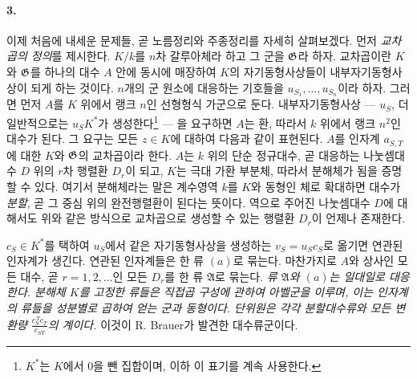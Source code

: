 \paragraph{3.}
이제 처음에 내세운 문제들, 곧 노름정리와 주종정리를 자세히 살펴보겠다. 먼저 \emph{교차곱의 정의}를 제시한다. \(K/k\)를 \(n\)차 갈루아체라 하고 그 군을 \(\mathfrak G\)라 하자. 교차곱이란 \(K\)와 \(\mathfrak G\)를 하나의 대수 \(A\) 안에 동시에 매장하여 \(K\)의 자기동형사상들이 내부자기동형사상이 되게 하는 것이다. \(n\)개의 군 원소에 대응하는 기호들을 \(u_{S_1},\ldots,u_{S_n}\)이라 하자. 그러면 먼저 \(A\)를 \(K\) 위에서 랭크 \(n\)인 선형형식 가군으로 둔다.
내부자기동형사상 --- \(u_S\), 더 일반적으로는 \(u_SK^\ast\)가 생성한다\footnote{\(K^\ast\)는 \(K\)에서 0을 뺀 집합이며, 이하 이 표기를 계속 사용한다.} --- 을 요구하면 \(A\)는 환, 따라서 \(k\) 위에서 랭크 \(n^2\)인 대수가 된다. 그 요구는 모든 \(z\in K\)에 대하여 다음과 같이 표현된다.
\(A\)를 인자계 \(a_{S,T}\)에 대한 \(K\)와 \(\mathfrak G\)의 교차곱이라 한다. \(A\)는 \(k\) 위의 단순 정규대수, 곧 대응하는 나눗셈대수 \(D\) 위의 \(r\)차 행렬환 \(D_r\)이 되고, \(K\)는 극대 가환 부분체, 따라서 분해체가 됨을 증명할 수 있다. 여기서 분해체라는 말은 계수영역 \(k\)를 \(K\)와 동형인 체로 확대하면 대수가 \emph{분할}, 곧 그 중심 위의 완전행렬환이 된다는 뜻이다. 역으로 주어진 나눗셈대수 \(D\)에 대해서도 위와 같은 방식으로 교차곱으로 생성할 수 있는 행렬환 \(D_r\)이 언제나 존재한다.

\(c_S\in K^\ast\)를 택하여 \(u_S\)에서 같은 자기동형사상을 생성하는 \(v_S=u_Sc_S\)로 옮기면 \glqq{}연관된\grqq{} 인자계가 생긴다.
연관된 인자계들은 한 류 \((a)\)로 묶는다. 마찬가지로 \(A\)와 상사인 모든 대수, 곧 \(r=1,2,\ldots\)인 모든 \(D_r\)를 한 류 \(\mathfrak A\)로 묶는다. \emph{류 \(\mathfrak A\)와 \((a)\)는 일대일로 대응한다. 분해체 \(K\)를 고정한 류들은 직접곱 구성에 관하여 아벨군을 이루며, 이는 인자계의 류들을 성분별로 곱하여 얻는 군과 동형이다. 단위원은 각각 분할대수류와 모든 변환량 \(\frac{c_S^{\,T}c_T}{c_{ST}}\)의 계이다.}
이것이 R. Brauer가 발견한 대수류군이다.

